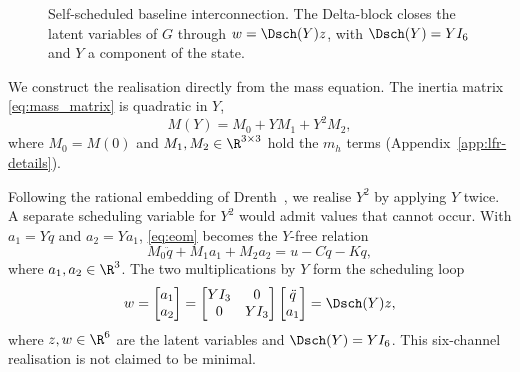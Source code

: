 \begin{figure}[t]
  \centering
  
  \caption{Self-scheduled baseline interconnection. The Delta-block closes
  the latent variables of $G$ through $w=\Dsch(Y)z$, with
  $\Dsch(Y)=YI_6$ and $Y$ a component of the state.}
  \label{fig:lfr}
\end{figure}

We construct the realisation directly from the mass equation.
The inertia matrix \eqref{eq:mass_matrix} is quadratic in $Y$,
\begin{equation}
  M(Y)=M_0+YM_1+Y^2M_2,
  \label{eq:Msplit}
\end{equation}
where $M_0=M(0)$ and $M_1,M_2\in\R^{3\times3}$ hold the $m_h$ terms
(Appendix~\ref{app:lfr-details}).

Following the rational embedding of Drenth~\cite[Sec.~2.1.1]{drenth2025thesis},
we realise $Y^2$ by applying $Y$ twice.
A separate scheduling variable for $Y^2$ would admit values that cannot
occur.
With $a_1=Y\ddot q$ and $a_2=Ya_1$, \eqref{eq:eom} becomes the $Y$-free
relation
\begin{equation}
  M_0\ddot q+M_1a_1+M_2a_2=u-C\dot q-Kq,
  \label{eq:lfr_constant}
\end{equation}
where $a_1,a_2\in\R^3$.
The two multiplications by $Y$ form the scheduling loop
\begin{equation}
  w=\begin{bmatrix}a_1\\a_2\end{bmatrix}
   =\begin{bmatrix}YI_3&0\\0&YI_3\end{bmatrix}
    \begin{bmatrix}\ddot q\\a_1\end{bmatrix}
   =\Dsch(Y)z,
  \label{eq:delta}
\end{equation}
where $z,w\in\R^6$ are the latent variables and $\Dsch(Y)=YI_6$.
This six-channel realisation is not claimed to be minimal.

